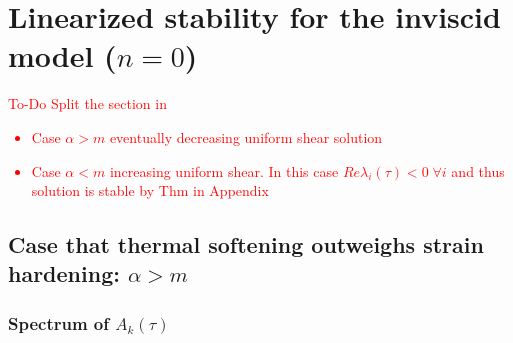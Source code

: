 \documentclass[a4paper,11pt]{article}
\newcommand{\tcr}{\textcolor{red}}
\theoremstyle{remark}
\begin{document}
%


\section{Linearized stability for the inviscid model ($n=0$)} \label{sec:Hadamard}

\tcr{To-Do  Split the section in
\begin{itemize}
\item Case $\alpha > m$ eventually decreasing uniform shear solution
\item Case $\alpha < m$ increasing uniform shear.
In this case $Re \lambda_i (\tau ) < 0 \; \forall i$ and thus solution is stable by Thm in Appendix
\end{itemize}
}




\subsection{Case that thermal softening outweighs strain hardening: $\alpha > m$}


\subsubsection{Spectrum of $A_k(\tau)$}
\end{document}
